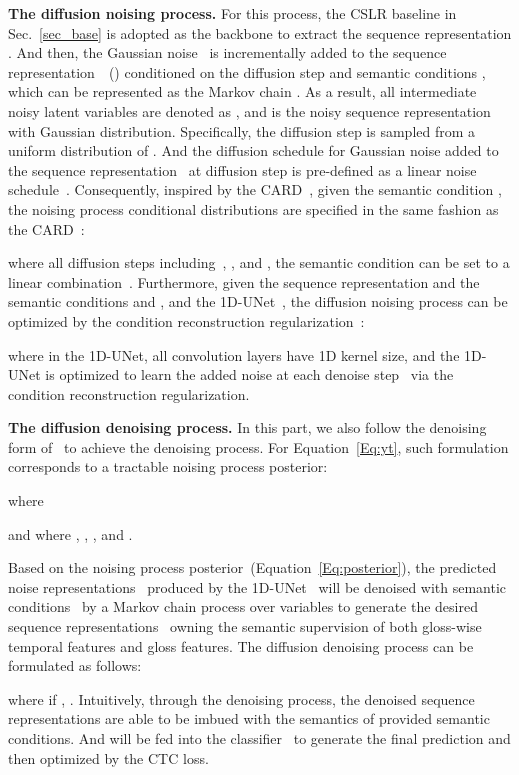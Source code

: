 \documentclass[sigconf]{acmart}
\begin{document}
\noindent\textbf{The diffusion noising process.}
For this process, the CSLR baseline in Sec.~\ref{sec_base} is adopted as the backbone to extract the sequence representation . 
And then, the Gaussian noise~ is incrementally added to the sequence representation~~() conditioned on the diffusion step  and semantic conditions , which can be represented
as the Markov chain .
As a result, all intermediate noisy latent variables are denoted as , and  is the noisy sequence representation with Gaussian distribution.
Specifically, the diffusion step  is sampled from a uniform distribution of .
And the diffusion schedule for Gaussian noise added to the sequence representation~ at diffusion step  is pre-defined as a linear noise schedule~.
Consequently, inspired by the CARD~\cite{han2022card}, given the semantic condition , the noising process conditional distributions are specified in the same fashion as the CARD~\cite{han2022card}:

\noindent where all diffusion steps including~, , and , the semantic condition  can be set to a linear combination~. 
Furthermore, given the sequence representation  and the semantic conditions  and , and the 1D-UNet~, the diffusion noising process can be optimized by the condition reconstruction regularization~:


\noindent where in the 1D-UNet, all convolution layers have 1D kernel size, and the 1D-UNet is optimized to learn the added noise at each denoise step~ via the condition reconstruction regularization.





\noindent\textbf{The diffusion denoising process.} 
In this part, we also follow the denoising form of~\cite{han2022card} to achieve the denoising process. 
For Equation~\ref{Eq:yt}, such formulation corresponds to a tractable noising process posterior:

\noindent where 

\noindent and where , , , and .

Based on the noising process posterior~(Equation~\ref{Eq:posterior}), 
the predicted noise representations~ produced by the 1D-UNet~ will be denoised with semantic conditions~ by a  Markov chain process over variables  to generate the desired sequence representations~ owning the semantic supervision of both gloss-wise temporal features and gloss features.
The diffusion denoising process can be formulated as follows:



\noindent where if , . Intuitively, through the denoising process, the denoised sequence representations  are able to be imbued with the semantics of provided semantic conditions. And  will be fed into the classifier~ to generate the final prediction and then optimized by the CTC loss.
\end{document}
